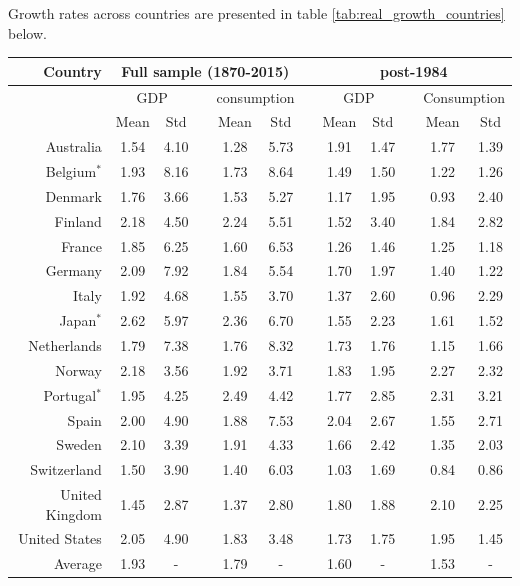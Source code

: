 {{{Growth rates across countries are presented in table \ref{tab:real_growth_countries} below. 
{\renewcommand{\arraystretch}{1.0}
\begin{table}[H]
\begin{center}
\begin{tabular}{rccccccccccc}
\hline
\hline
Country & \multicolumn{5}{c}{Full sample (1870-2015)} & & \multicolumn{5}{c}{post-1984} \\
\hline
 & \multicolumn{2}{c}{GDP} & & \multicolumn{2}{c}{consumption} & & \multicolumn{2}{c}{GDP} & & \multicolumn{2}{c}{Consumption}\\
\cline{2-3} \cline{5-6} \cline{8-9} \cline{11-12}
 & Mean & Std & & Mean & Std & & Mean & Std & & Mean & Std\\
\hline
Australia & 1.54 & 4.10 & & 1.28 & 5.73 & & 1.91 & 1.47 & & 1.77 & 1.39\\
Belgium$^{*}$ & 1.93 & 8.16 & & 1.73 & 8.64 & & 1.49 & 1.50 & & 1.22 & 1.26 \\
Denmark & 1.76 & 3.66 & & 1.53 & 5.27 & & 1.17 & 1.95 & & 0.93 & 2.40 \\
Finland & 2.18 & 4.50 & & 2.24 & 5.51 & & 1.52 & 3.40 & & 1.84 & 2.82\\
France & 1.85 & 6.25 & & 1.60 & 6.53 & & 1.26 & 1.46 & & 1.25 & 1.18\\
Germany & 2.09 & 7.92 & & 1.84 & 5.54 & & 1.70 & 1.97 & & 1.40 & 1.22\\
Italy & 1.92 & 4.68 & & 1.55 & 3.70 & & 1.37 & 2.60 & & 0.96 & 2.29\\
Japan$^{*}$ & 2.62 & 5.97 & & 2.36 & 6.70 & & 1.55 & 2.23 & & 1.61 & 1.52\\
Netherlands & 1.79 & 7.38 & & 1.76 & 8.32 & & 1.73 & 1.76 & & 1.15 & 1.66 \\
Norway & 2.18 & 3.56 & & 1.92 & 3.71 & & 1.83 & 1.95 & & 2.27 & 2.32\\
Portugal$^{*}$ & 1.95 & 4.25 & & 2.49 & 4.42 & & 1.77 & 2.85 & & 2.31 & 3.21 \\
Spain & 2.00 & 4.90 & & 1.88 &  7.53 & & 2.04 & 2.67 & & 1.55 & 2.71\\
Sweden & 2.10 & 3.39 & & 1.91 & 4.33 & & 1.66 & 2.42 & & 1.35 & 2.03\\
Switzerland & 1.50 & 3.90 & & 1.40 & 6.03 & & 1.03 & 1.69 & & 0.84 & 0.86\\
United Kingdom & 1.45 & 2.87 & & 1.37 & 2.80 & & 1.80 & 1.88 & & 2.10 & 2.25\\
United States & 2.05 & 4.90 & & 1.83 & 3.48 & & 1.73 & 1.75 & & 1.95 & 1.45 \\
\hline
Average & 1.93 & - & & 1.79 & - & & 1.60 & - & & 1.53 & -\\


\end{tabular}
\end{center}
\end{table}}}}}
